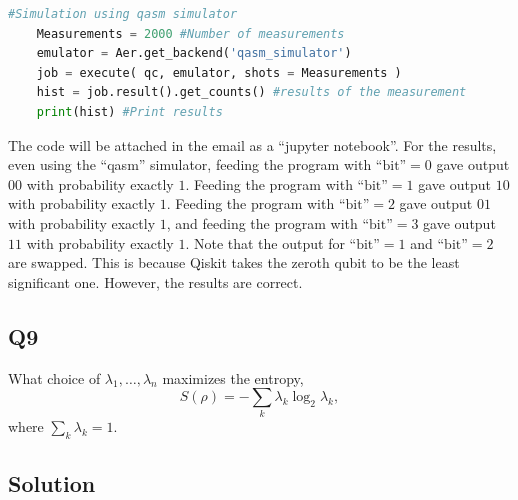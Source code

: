 \documentclass[12pt]{article}
\begin{document}
\begin{appendices}
\begin{enumerate}
\begin{lstlisting}[language=Python]
    #Simulation using qasm simulator
    Measurements = 2000 #Number of measurements
    emulator = Aer.get_backend('qasm_simulator')
    job = execute( qc, emulator, shots = Measurements )
    hist = job.result().get_counts() #results of the measurement
    print(hist) #Print results
    \end{lstlisting}
\end{enumerate}
The code will be attached in the email as a ``jupyter notebook''. For the results, even using the ``qasm'' simulator, feeding the program with $\textrm{``bit''} = 0$ gave output $00$ with probability exactly $1$. Feeding the program with $\textrm{``bit''} = 1$ gave output $10$ with probability exactly $1$. Feeding the program with $\textrm{``bit''} = 2$ gave output $01$ with probability exactly $1$, and feeding the program with $\textrm{``bit''} = 3$ gave output $11$ with probability exactly $1$. Note that the output for $\textrm{``bit''} = 1$ and $\textrm{``bit''} = 2$ are swapped. This is because Qiskit takes the zeroth qubit to be the least significant one. However, the results are correct.




\subsection*{Q9}
What choice of $\lambda_1, \ldots, \lambda_n$ maximizes the entropy,
\[S(\rho) = -\sum_k\lambda_k\log_2\lambda_k,\]
where $\sum_k\lambda_k = 1$.

\subsection*{Solution}


\end{appendices}
\end{document}
